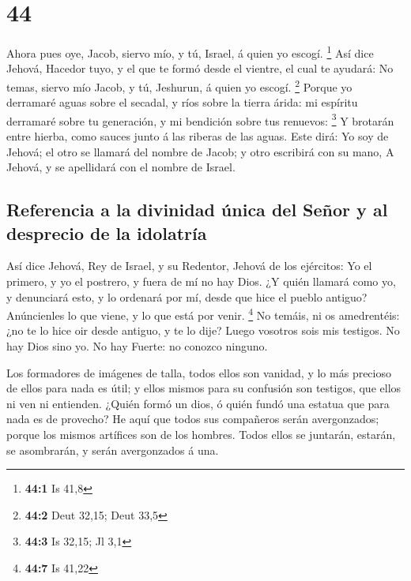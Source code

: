 \hypertarget{section-43}{%
\section{44}\label{section-43}}

 Ahora pues oye, Jacob, siervo mío, y tú, Israel, á quien
yo escogí. \footnote{\textbf{44:1} Is 41,8}  Así dice
Jehová, Hacedor tuyo, y el que te formó desde el vientre, el cual te
ayudará: No temas, siervo mío Jacob, y tú, Jeshurun, á quien yo escogí.
\footnote{\textbf{44:2} Deut 32,15; Deut 33,5}  Porque yo
derramaré aguas sobre el secadal, y ríos sobre la tierra árida: mi
espíritu derramaré sobre tu generación, y mi bendición sobre tus
renuevos: \footnote{\textbf{44:3} Is 32,15; Jl 3,1}  Y
brotarán entre hierba, como sauces junto á las riberas de las aguas.
 Este dirá: Yo soy de Jehová; el otro se llamará del
nombre de Jacob; y otro escribirá con su mano, A Jehová, y se apellidará
con el nombre de Israel.

\hypertarget{referencia-a-la-divinidad-uxfanica-del-seuxf1or-y-al-desprecio-de-la-idolatruxeda}{%
\subsection{Referencia a la divinidad única del Señor y al desprecio de
la
idolatría}\label{referencia-a-la-divinidad-uxfanica-del-seuxf1or-y-al-desprecio-de-la-idolatruxeda}}

 Así dice Jehová, Rey de Israel, y su Redentor, Jehová de
los ejércitos: Yo el primero, y yo el postrero, y fuera de mí no hay
Dios.  ¿Y quién llamará como yo, y denunciará esto, y lo
ordenará por mí, desde que hice el pueblo antiguo? Anúncienles lo que
viene, y lo que está por venir. \footnote{\textbf{44:7} Is 41,22}
 No temáis, ni os amedrentéis: ¿no te lo hice oir desde
antiguo, y te lo dije? Luego vosotros sois mis testigos. No hay Dios
sino yo. No hay Fuerte: no conozco ninguno.

 Los formadores de imágenes de talla, todos ellos son
vanidad, y lo más precioso de ellos para nada es útil; y ellos mismos
para su confusión son testigos, que ellos ni ven ni entienden.
 ¿Quién formó un dios, ó quién fundó una estatua que para
nada es de provecho?  He aquí que todos sus compañeros
serán avergonzados; porque los mismos artífices son de los hombres.
Todos ellos se juntarán, estarán, se asombrarán, y serán avergonzados á
una.

